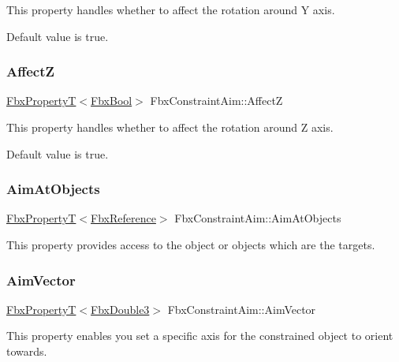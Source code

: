 This property handles whether to affect the rotation around Y axis.

Default value is true. \mbox{\label{class_fbx_constraint_aim_ae376b28fe860f28e13a92c8ce727363c}} 
\subsubsection{\texorpdfstring{AffectZ}{AffectZ}}
{\footnotesize\ttfamily \hyperlink{class_fbx_property_t}{Fbx\+PropertyT}$<$\hyperlink{fbxtypes_8h_a92e0562b2fe33e76a242f498b362262e}{Fbx\+Bool}$>$ Fbx\+Constraint\+Aim\+::\+AffectZ}

This property handles whether to affect the rotation around Z axis.

Default value is true. \mbox{\label{class_fbx_constraint_aim_a502a01a00e7756b82d697e881fb21504}} 
\subsubsection{\texorpdfstring{Aim\+At\+Objects}{AimAtObjects}}
{\footnotesize\ttfamily \hyperlink{class_fbx_property_t}{Fbx\+PropertyT}$<$\hyperlink{fbxtypes_8h_a44df6a2eec915cf27cd481e5c5e48a24}{Fbx\+Reference}$>$ Fbx\+Constraint\+Aim\+::\+Aim\+At\+Objects}

This property provides access to the object or objects which are the targets. \mbox{\label{class_fbx_constraint_aim_a7d4ef157e40e8bcb8f1cb3f12f8f9b01}} 
\subsubsection{\texorpdfstring{Aim\+Vector}{AimVector}}
{\footnotesize\ttfamily \hyperlink{class_fbx_property_t}{Fbx\+PropertyT}$<$\hyperlink{fbxtypes_8h_ae0a96f14cde566774c7553aa7523b7a7}{Fbx\+Double3}$>$ Fbx\+Constraint\+Aim\+::\+Aim\+Vector}

This property enables you set a specific axis for the constrained object to orient towards.

